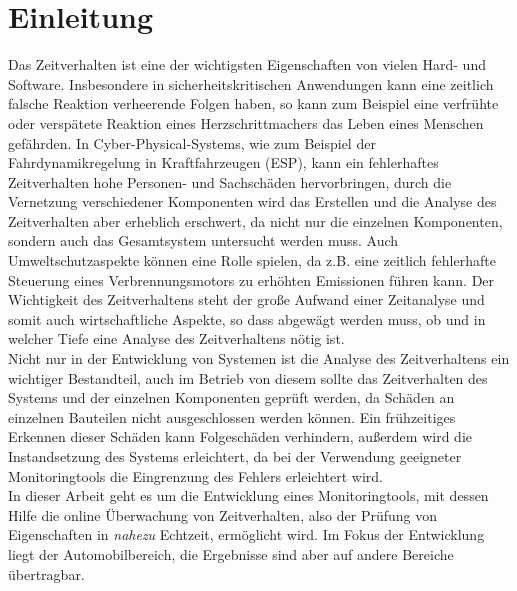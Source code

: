 
\chapter{Einleitung}

Das Zeitverhalten ist eine der wichtigsten Eigenschaften von vielen Hard- und Software. Insbesondere in sicherheitskritischen Anwendungen kann eine zeitlich falsche Reaktion verheerende Folgen haben, so kann zum Beispiel eine verfrühte oder verspätete Reaktion eines Herzschrittmachers das Leben eines Menschen gefährden. In Cyber-Physical-Systems, wie zum Beispiel der Fahrdynamikregelung in Kraftfahrzeugen (ESP), kann ein fehlerhaftes Zeitverhalten hohe Personen- und Sachschäden hervorbringen, durch die Vernetzung verschiedener Komponenten wird das Erstellen und die Analyse des Zeitverhalten aber erheblich erschwert, da nicht nur die einzelnen Komponenten, sondern auch das Gesamtsystem untersucht werden muss. Auch Umweltschutzaspekte können eine Rolle spielen, da z.B. eine zeitlich fehlerhafte Steuerung eines Verbrennungsmotors zu erhöhten Emissionen führen kann.
Der Wichtigkeit des Zeitverhaltens steht der große Aufwand einer Zeitanalyse und somit auch wirtschaftliche Aspekte, so dass abgewägt werden muss, ob und in welcher Tiefe eine Analyse des Zeitverhaltens nötig ist.\\
Nicht nur in der Entwicklung von Systemen ist die Analyse des Zeitverhaltens ein wichtiger Bestandteil, auch im Betrieb von diesem sollte das Zeitverhalten des Systems und der einzelnen Komponenten geprüft werden, da Schäden an einzelnen Bauteilen nicht ausgeschlossen werden können. Ein frühzeitiges Erkennen dieser Schäden kann Folgeschäden verhindern, außerdem wird die Instandsetzung des Systems erleichtert, da bei der Verwendung geeigneter Monitoringtools die Eingrenzung des Fehlers erleichtert wird.\\
In dieser Arbeit geht es um die Entwicklung eines Monitoringtools, mit dessen Hilfe die online Überwachung von Zeitverhalten, also der Prüfung von Eigenschaften in \emph{nahezu} Echtzeit, ermöglicht wird. Im Fokus der Entwicklung liegt der Automobilbereich, die Ergebnisse sind aber auf andere Bereiche übertragbar.

